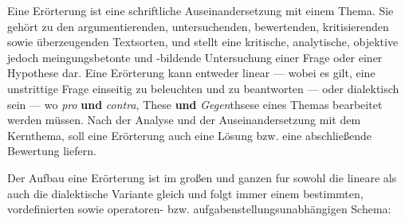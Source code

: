 



\thispagestyle{plain}



Eine Er\"{o}rterung ist eine schriftliche Auseinandersetzung mit einem Thema. Sie geh\"{o}rt zu den argumentierenden, untersuchenden, bewertenden, kritisierenden sowie \"{u}berzeugenden Textsorten, und stellt eine kritische, analytische, objektive jedoch meingungsbetonte und -bildende Untersuchung einer Frage oder einer Hypothese dar. Eine Er\"{o}rterung kann entweder linear --- wobei es gilt, eine unstrittige Frage einseitig zu beleuchten und zu beantworten --- oder dialektisch sein --- wo \emph{pro} \textbf{und} \emph{contra}, These \textbf{und} \emph{Gegen}thsese eines Themas bearbeitet werden m\"{u}ssen. Nach der Analyse und der Auseinandersetzung mit dem Kernthema, soll eine Er\"{o}rterung auch eine L\"{o}sung bzw. eine abschlie\ss{}ende Bewertung liefern.


Der Aufbau eine Er\"{o}rterung ist im gro\ss{}en und ganzen fur sowohl die lineare als auch die dialektische Variante gleich und folgt immer einem bestimmten, vordefinierten sowie operatoren- bzw. aufgabenstellungsunabh\"{a}ngigen Schema:

